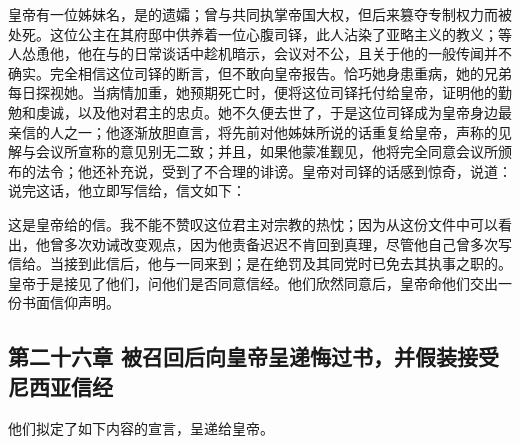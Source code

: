 皇帝有一位姊妹名，是的遗孀；曾与共同执掌帝国大权，但后来篡夺专制权力而被处死。这位公主在其府邸中供养着一位心腹司铎，此人沾染了亚略主义的教义；等人怂恿他，他在与的日常谈话中趁机暗示，会议对不公，且关于他的一般传闻并不确实。完全相信这位司铎的断言，但不敢向皇帝报告。恰巧她身患重病，她的兄弟每日探视她。当病情加重，她预期死亡时，便将这位司铎托付给皇帝，证明他的勤勉和虔诚，以及他对君主的忠贞。她不久便去世了，于是这位司铎成为皇帝身边最亲信的人之一；他逐渐放胆直言，将先前对他姊妹所说的话重复给皇帝，声称的见解与会议所宣称的意见别无二致；并且，如果他蒙准觐见，他将完全同意会议所颁布的法令；他还补充说，受到了不合理的诽谤。皇帝对司铎的话感到惊奇，说道：说完这话，他立即写信给，信文如下：\par

\par

\par

这是皇帝给的信。我不能不赞叹这位君主对宗教的热忱；因为从这份文件中可以看出，他曾多次劝诫改变观点，因为他责备迟迟不肯回到真理，尽管他自己曾多次写信给。当接到此信后，他与一同来到；是在绝罚及其同党时已免去其执事之职的。皇帝于是接见了他们，问他们是否同意信经。他们欣然同意后，皇帝命他们交出一份书面信仰声明。\par


\subsection{第二十六章 被召回后向皇帝呈递悔过书，并假装接受尼西亚信经}

他们拟定了如下内容的宣言，呈递给皇帝。\par

